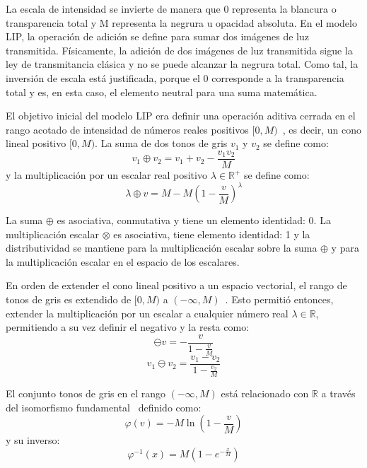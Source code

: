 La escala de intensidad se invierte de manera que 0 representa la blancura o transparencia total y M representa la negrura u opacidad absoluta. En el modelo LIP, la operación de adición se define para sumar dos imágenes de luz transmitida. Físicamente, la adición de dos imágenes de luz transmitida sigue la ley de transmitancia clásica y no se puede alcanzar la negrura total. Como tal, la inversión de escala está justificada, porque el 0 corresponde a la transparencia total y es, en esta caso, el elemento neutral para una suma matemática.

El objetivo inicial del modelo LIP era definir una operación aditiva cerrada en el rango acotado de intensidad de números reales positivos $[0, M)$~\cite{jourlin1988model}, es decir, un cono lineal positivo $[0, M )$. La suma de dos tonos de gris $v_1$ y $v_2$ se define como:
\begin{equation}
	v_1\oplus v_2=v_1+v_2-\frac{v_1v_2}{M}
\end{equation}
y la multiplicación por un escalar real positivo $\lambda \in \mathbb{R}^+$ se define como:
\begin{equation}
	\lambda \oplus v = M - M\left(1-\frac{v}{M}\right)^\lambda
\end{equation}

La suma $\oplus$ es asociativa, conmutativa y tiene un elemento identidad: 0. La multiplicaci\'on escalar $\otimes$ es asociativa, tiene elemento identidad: 1 y la distributividad se mantiene para la multiplicación escalar sobre la suma $\oplus$ y para la multiplicación escalar en el espacio de los escalares.

En orden de extender el cono lineal positivo a un espacio vectorial, el rango de tonos de gris es extendido de $[0,M)$ a $(-\infty,M)$~\cite{jourlin2016logarithmic}. Esto permiti\'o entonces, extender la multiplicaci\'on por un escalar a cualquier n\'umero real $\lambda \in \mathbb{R}$, permitiendo a su vez definir el negativo y la resta como:
\begin{equation}
	\ominus v=-\frac{v}{1-\frac{v}{M}}
\end{equation}
\begin{equation}
	v_1 \ominus v_2 = \frac{v_1-v_2}{1-\frac{v_2}{M}}
\end{equation}

El conjunto tonos de gris en el rango $(-\infty, M)$ está relacionado con $\mathbb{R}$ a través del isomorfismo fundamental~\cite{jourlin2016logarithmic} definido como:
\begin{equation}
	\varphi(v) = -M\ln\left(1-\frac{v}{M}\right)
\end{equation}
y su inverso:
\begin{equation}
	\varphi^{-1} (x) = M\left(1-e^{-\frac{x}{M}}\right)
\end{equation}

